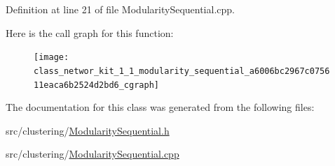Definition at line 21 of file Modularity\-Sequential.\-cpp.



Here is the call graph for this function\-:
\nopagebreak
\begin{figure}[H]
\begin{center}
\leavevmode
\texttt{[image: class\_networ\_kit\_1\_1\_modularity\_sequential\_a6006bc2967c075611eaca6b2524d2bd6\_cgraph]}
\end{center}
\end{figure}




The documentation for this class was generated from the following files\-:\begin{DoxyCompactItemize}
\item 
src/clustering/\hyperlink{_modularity_sequential_8h}{Modularity\-Sequential.\-h}\item 
src/clustering/\hyperlink{_modularity_sequential_8cpp}{Modularity\-Sequential.\-cpp}\end{DoxyCompactItemize}
